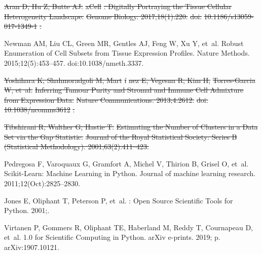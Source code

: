 \documentclass[10pt,letterpaper]{article}
\providecommand{\DIFdeltex}[1]{{\protect\color{red}\sout{#1}}}                      %
\providecommand{\DIFdelbegin}{} %
\providecommand{\DIFdelend}{} %
\providecommand{\DIFdel}[1]{\texorpdfstring{\DIFdeltex{#1}}{}} %
\newcommand{\DIFscaledelfig}{0.5}
\newlength{\DIFdelgraphicswidth} %
\newlength{\DIFdelgraphicsheight} %
\newcommand{\DIFdelincludegraphics}[2][]{%
\sbox{\DIFdelgraphicsbox}{\DIFOincludegraphics[#1]{#2}}%
\settoboxwidth{\DIFdelgraphicswidth}{\DIFdelgraphicsbox} %
\settoboxtotalheight{\DIFdelgraphicsheight}{\DIFdelgraphicsbox} %
\scalebox{\DIFscaledelfig}{%
\parbox[b]{\DIFdelgraphicswidth}{\usebox{\DIFdelgraphicsbox}\\[-\baselineskip] \rule{\DIFdelgraphicswidth}{0em}}\llap{\resizebox{\DIFdelgraphicswidth}{\DIFdelgraphicsheight}{%
\setlength{\unitlength}{\DIFdelgraphicswidth}%
\begin{picture}(1,1)%
\thicklines\linethickness{2pt} %
{\color[rgb]{1,0,0}\put(0,0){\framebox(1,1){}}}%
{\color[rgb]{1,0,0}\put(0,0){\line( 1,1){1}}}%
{\color[rgb]{1,0,0}\put(0,1){\line(1,-1){1}}}%
\end{picture}%
}\hspace*{3pt}}} %
} %
\DeclareRobustCommand{\DIFdelbegin}{\DIFOdelbegin \let\includegraphics\DIFdelincludegraphics} %
\DeclareRobustCommand{\DIFdelend}{\DIFOaddend \let\includegraphics\DIFOincludegraphics} %
\begin{document}
\begin{thebibliography}{10}
	\DIFdelbegin %
\DIFdel{Aran D, Hu Z, Butte AJ.
	}%
\DIFdel{xCell}%
\DIFdel{: Digitally Portraying the Tissue Cellular Heterogeneity
	Landscape.
	}%
\DIFdel{Genome Biology. 2017;18(1):220.
	}%
\DIFdel{doi:}%
\DIFdel{10.1186/s13059-017-1349-1}%
\DIFdel{.
	}%

\DIFdelend {}
	Newman AM, Liu CL, Green MR, Gentles AJ, Feng W, Xu Y, et~al.
	\newblock Robust Enumeration of Cell Subsets from Tissue Expression Profiles.
	\newblock Nature Methods. 2015;12(5):453--457.
	\newblock doi:{10.1038/nmeth.3337}.

	\DIFdelbegin %
\DIFdel{Yoshihara K, Shahmoradgoli M, Mart}%
\DIFdel{\'i}%
\DIFdel{nez E, Vegesna R, Kim H, }%
\DIFdel{Torres-Garcia}%
\DIFdel{W, et~al.
	}%
\DIFdel{Inferring Tumour Purity and Stromal and Immune Cell Admixture from
	Expression Data.
	}%
\DIFdel{Nature Communications. 2013;4:2612.
	}%
\DIFdel{doi:}%
\DIFdel{10.1038/ncomms3612}%
\DIFdel{.
	}%

\DIFdel{Tibshirani R, Walther G, Hastie T.
	}%
\DIFdel{Estimating the Number of Clusters in a Data Set via the Gap
	Statistic.
	}%
\DIFdel{Journal of the Royal Statistical Society: Series B (Statistical
	Methodology). 2001;63(2):411--423.
	}%

\DIFdelend {}
	Pedregosa F, Varoquaux G, Gramfort A, Michel V, Thirion B, Grisel O, et~al.
	\newblock Scikit-Learn: Machine Learning in Python.
	\newblock Journal of machine learning research. 2011;12(Oct):2825--2830.

	Jones E, Oliphant T, Peterson P, et~al.
	: {{Open}} Source Scientific Tools for {{Python}}. 2001;.

	Virtanen P, Gommers R, Oliphant TE, Haberland M, Reddy T, Cournapeau D, et~al.
	 1.0 for {{Scientific
			Computing}} in {{Python}}.
	\newblock arXiv e-prints. 2019; p. arXiv:1907.10121.


\end{thebibliography}
\end{document}
